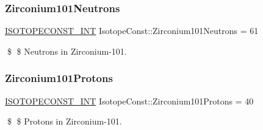 \subsubsection{\texorpdfstring{Zirconium101\+Neutrons}{Zirconium101Neutrons}}
{\footnotesize\ttfamily \mbox{\hyperlink{group___isotope_const-_macros_ga5f18360b3e99483a35c32d789e62621c}{I\+S\+O\+T\+O\+P\+E\+C\+O\+N\+S\+T\+\_\+\+I\+NT}} Isotope\+Const\+::\+Zirconium101\+Neutrons = 61}

\$ \$ Neutrons in Zirconium-\/101. \mbox{\label{group___isotope_const-_zirconium-_zr101_ga7a268bc4fd996e2684af2f53e23eab0a}} 
\subsubsection{\texorpdfstring{Zirconium101\+Protons}{Zirconium101Protons}}
{\footnotesize\ttfamily \mbox{\hyperlink{group___isotope_const-_macros_ga5f18360b3e99483a35c32d789e62621c}{I\+S\+O\+T\+O\+P\+E\+C\+O\+N\+S\+T\+\_\+\+I\+NT}} Isotope\+Const\+::\+Zirconium101\+Protons = 40}

\$ \$ Protons in Zirconium-\/101. 